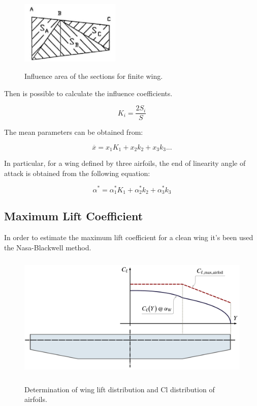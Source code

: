 \begin{figure}[H]
\centering
{\includegraphics[height=3cm]{Immagini/influencearea}} 
\caption{Influence area of the sections for finite wing.}
\label{fig:influencearea}
\end{figure}

Then is possible to calculate the influence coefficients. 

\begin{equation}
K_i = \frac{2 S_i}{S}
\end{equation}

The mean parameters can be obtained from:

\begin{equation}
\overline{x} = x_1 K_1 + x_2 k_2 +x_3 k_3...
\end{equation}

In particular, for a wing defined by three airfoils, the end of linearity angle of attack is obtained from the following equation:

\begin{equation}
\alpha^* = \alpha^*_{1} K_1 + \alpha^*_{2} k_2 +\alpha^*_{3} k_3
\end{equation}

\subsection{Maximum Lift Coefficient}

In order to estimate the maximum lift coefficient for a clean wing it's been used the Nasa-Blackwell method. %

\begin{figure}[H]
\centering
{\includegraphics[height=6cm]{Immagini/Loading_Stall_Path_A}} 
\caption{Determination of wing lift distribution and Cl distribution of airfoils.}
\label{fig:stall0}
\end{figure}




